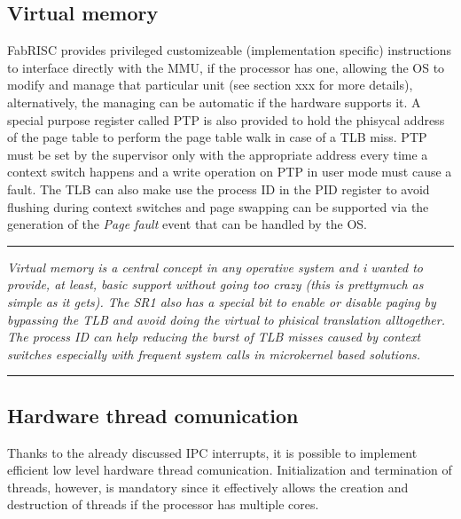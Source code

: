 \documentclass{article}
\begin{document}
        \subsection{Virtual memory}

            FabRISC provides privileged customizeable (implementation specific) instructions to interface directly with the MMU, if the processor has one, allowing the OS to modify and manage that particular unit (see section xxx for more details), alternatively, the managing can be automatic if the hardware supports it. A special purpose register called PTP is also provided to hold the phisycal address of the page table to perform the page table walk in case of a TLB miss. PTP must be set by the supervisor only with the appropriate address every time a context switch happens and a write operation on PTP in user mode must cause a fault. The TLB can also make use the process ID in the PID register to avoid flushing during context switches and page swapping can be supported via the generation of the \textit{Page fault} event that can be handled by the OS.

        \par\noindent\rule{\textwidth}{0.4pt}
        \textit{Virtual memory is a central concept in any operative system and i wanted to provide, at least, basic support without going too crazy (this is prettymuch as simple as it gets). The SR1 also has a special bit to enable or disable paging by bypassing the TLB and avoid doing the virtual to phisical translation alltogether. The process ID can help reducing the burst of TLB misses caused by context switches especially with frequent system calls in microkernel based solutions.}
        \par\noindent\rule{\textwidth}{0.4pt}

        \subsection{Hardware thread comunication}

            Thanks to the already discussed IPC interrupts, it is possible to implement efficient low level hardware thread comunication. Initialization and termination of threads, however, is mandatory since it effectively allows the creation and destruction of threads if the processor has multiple cores.
\end{document}
